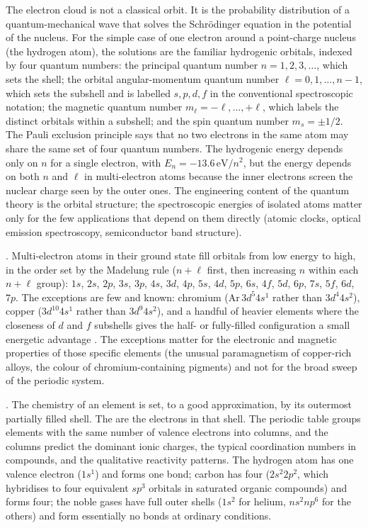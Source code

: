 The electron cloud is not a classical orbit. It is the probability
distribution of a quantum-mechanical wave that solves the
Schr\"odinger equation in the potential of the nucleus. For the simple
case of one electron around a point-charge nucleus (the hydrogen atom),
the solutions are the familiar hydrogenic orbitals, indexed by four
quantum numbers: the principal quantum number $n = 1, 2, 3, \ldots$,
which sets the shell; the orbital angular-momentum quantum number
$\ell = 0, 1, \ldots, n-1$, which sets the subshell and is labelled
$s, p, d, f$ in the conventional spectroscopic notation; the magnetic
quantum number $m_\ell = -\ell, \ldots, +\ell$, which labels the
distinct orbitals within a subshell; and the spin quantum number
$m_s = \pm 1/2$. The Pauli exclusion principle says that no two
electrons in the same atom may share the same set of four quantum
numbers. The hydrogenic energy depends only on $n$ for a single
electron, with $E_n = -13.6\,\text{eV}/n^2$, but the energy depends on
both $n$ and $\ell$ in multi-electron atoms because the inner electrons
screen the nuclear charge seen by the outer ones. The engineering
content of the quantum theory is the orbital structure; the
spectroscopic energies of isolated atoms matter only for the few
applications that depend on them directly (atomic clocks, optical
emission spectroscopy, semiconductor band structure).

. Multi-electron atoms in their ground state
fill orbitals from low energy to high, in the order set by the
Madelung rule ($n + \ell$ first, then increasing $n$ within each
$n+\ell$ group): $1s$, $2s$, $2p$, $3s$, $3p$, $4s$, $3d$, $4p$, $5s$,
$4d$, $5p$, $6s$, $4f$, $5d$, $6p$, $7s$, $5f$, $6d$, $7p$. The
exceptions are few and known: chromium ($\text{Ar}\,3d^5 4s^1$ rather
than $3d^4 4s^2$), copper ($3d^{10} 4s^1$ rather than $3d^9 4s^2$),
and a handful of heavier elements where the closeness of $d$ and $f$
subshells gives the half- or fully-filled configuration a small
energetic advantage \cite[ch.~9]{text:atkins-physical-chemistry}. The
exceptions matter for the electronic and magnetic properties of those
specific elements (the unusual paramagnetism of copper-rich alloys,
the colour of chromium-containing pigments) and not for the broad
sweep of the periodic system.

. The chemistry of an element is set, to a good
approximation, by its outermost partially filled shell. The
 are the electrons in that shell. The
periodic table groups elements with the same number of valence
electrons into columns, and the columns predict the dominant ionic
charges, the typical coordination numbers in compounds, and the
qualitative reactivity patterns. The hydrogen atom has one valence
electron ($1s^1$) and forms one bond; carbon has four ($2s^2 2p^2$,
which hybridises to four equivalent $sp^3$ orbitals in saturated
organic compounds) and forms four; the noble gases have full outer
shells ($1s^2$ for helium, $ns^2 np^6$ for the others) and form
essentially no bonds at ordinary conditions.

